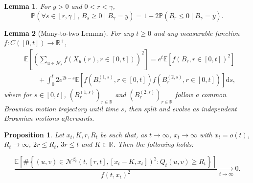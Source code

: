 \documentclass[10pt,a4paper]{amsart}
\newtheorem{proposition}{Proposition}
\newtheorem{lemma}{Lemma}
\newcommand{\E}[0]{\mathbb{E}}
\newcommand{\Prob}{\mathbb{P}}
\begin{document}
\begin{lemma}\label{reflectionprinciple0}
For $y>0$ and $0<r<\gamma$,
\begin{equation}
    \Prob(\forall s \in [r, \gamma] \, , \, B_s \geq 0 \mid B_\gamma = y ) = 1- 2\Prob(B_r \leq 0 \mid B_\gamma = y ).
\end{equation}
\end{lemma}

\begin{lemma}[Many-to-two Lemma]\label{manyto2}
    For any $t\geq 0$ and any measurable function $f: C([0,t])  \rightarrow \mathbb{R^+}$,
\begin{equation}
    \begin{split}
        &\E\left[ \left(\sum_{u\in \mathcal{N}_t}f(X_u(r),r \in \left[0,t\right])\right)^2 \right] = e^t \E\left[ f(B_r, r\in \left[0,t\right] )^2\right]\\
        & \qquad  + \int_0^t 2e^{2t-s}\E\left[ f(B^{(1,s)}_r, r\in \left[0,t\right])f(B^{(2,s)}_r, r\in \left[0,t\right])  \right]\mathrm{d}s,
    \end{split}
\end{equation}
where for $s \in \left[0,t\right]$, $(B^{(1,s)}_r)_{r\in \mathbb{R}}$ and $(B^{(2,s)}_r)_{r\in \mathbb{R}}$ follow a common Brownian motion trajectory until time $s$, then split and evolve as independent Brownian motions afterwards.
\end{lemma}

\begin{proposition}\label{L2boundlocancestor}
Let $x_t, K, r, R_t$ be such that, as $t\to \infty$, \( x_t \to \infty \) with \( x_t = o(t) \), \( R_t \to \infty \), $2r\leq R_t$, $3r \leq t$ and $K\in \mathbb{R}$. Then the following holds:

\begin{equation}
    \frac{\E\left[\#\left\{(u,v) \in \mathcal{N}^{\beta_t}(t,[r,t],[x_t-K,x_t])^2 : Q_t(u,v) \geq R_t \right\}\right]}{f(t,x_t)^2}\xrightarrow[t\rightarrow \infty]{}0.
\end{equation}
\end{proposition}
\end{document}
